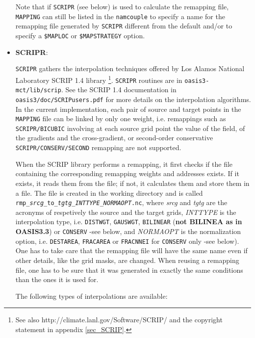 \begin{itemize}
\begin{itemize}
  \end{itemize}

Note that if {\tt SCRIPR} (see below) is used to calculate the remapping file, {\tt MAPPING} can still be listed in the {\tt namcouple} to specify a name for the remapping file generated by {\tt SCRIPR} different from the default and/or to specify a {\tt \$MAPLOC} or {\tt \$MAPSTRATEGY} option.

\item {\bf SCRIPR}: 
 
  {\tt SCRIPR} gathers the interpolation techniques offered by Los
  Alamos National Laboratory SCRIP 1.4 library \citep{Jones99}\footnote{See also http://climate.lanl.gov/Software/SCRIP/ and the
    copyright statement in appendix \ref{sec_SCRIP}.}.
  {\tt SCRIPR} routines are in {\tt oasis3-mct/lib/scrip}. See the SCRIP 1.4
  documentation in {\tt oasis3/doc/SCRIPusers.pdf} for more
  details on the interpolation algorithms.  
  In the current implementation, each pair of source and target points
  in the {\tt MAPPING} file can be linked by only one weight,
  i.e. remappings such as {\tt SCRIPR/BICUBIC} involving at each
  source grid point the value of the field, of the gradients and the
  cross-gradient, or second-order conservative {\tt
    SCRIPR/CONSERV/SECOND} remapping are not
  supported.  

When the SCRIP library performs a remapping, it first checks if the
file containing the corresponding remapping weights and addresses
exists. If it exists, it reads them from the file; if not, it calculates
them and store them in a file. The file is created in the working
directory and is called {\tt
  rmp\_{\it srcg}\_to\_{\it tgtg}\_{\it INTTYPE}\_{\it NORMAOPT}.nc}, where {\it srcg} and
{\it tgtg} are the acronyms of respetively the source and the target
grids, {\it INTTYPE} is the interpolation type, i.e. {\tt DISTWGT},
{\tt GAUSWGT}, {\tt BILINEAR} ({\bf not BILINEA as in OASIS3.3}) or
{\tt CONSERV} -see below, and
{\it NORMAOPT} is the normalization option, i.e. {\tt DESTAREA},
{\tt FRACAREA} or {\tt FRACNNEI} for {\tt CONSERV} only -see
below). One has to take care that the remapping file will have the same name
even if other details, like the grid masks, are changed. When reusing
a remapping file, one has to be sure that it was generated in exactly
the same conditions than the ones it is used for.  

  The following types of interpolations are available:

  \begin{itemize}


\end{itemize}
\end{itemize}
